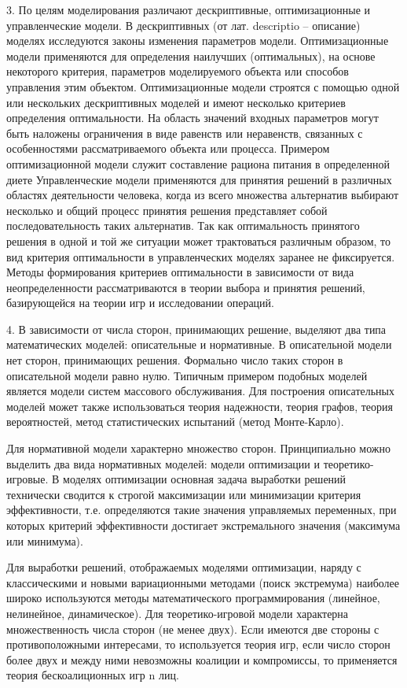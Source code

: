3. По целям моделирования различают дескриптивные, оптимизационные и управленческие модели. В дескриптивных (от лат. descriptio – описание) моделях исследуются законы изменения параметров модели. 
Оптимизационные модели применяются для определения наилучших (оптимальных), на основе некоторого критерия, параметров моделируемого объекта или способов управления этим объектом. Оптимизационные модели строятся с помощью одной или нескольких дескриптивных моделей и имеют несколько критериев определения оптимальности. На область значений входных параметров могут быть наложены ограничения в виде равенств или неравенств, связанных с особенностями рассматриваемого объекта или процесса. Примером оптимизационной модели служит составление рациона питания в определенной диете 
Управленческие модели применяются для принятия решений в различных областях деятельности человека, когда из всего множества альтернатив выбирают несколько и общий процесс принятия решения представляет собой последовательность таких альтернатив. Так как оптимальность принятого решения в одной и той же ситуации может трактоваться различным образом, то вид критерия оптимальности в управленческих моделях заранее не фиксируется. Методы формирования критериев оптимальности в зависимости от вида неопределенности рассматриваются в теории выбора и принятия решений, базирующейся на теории игр и исследовании операций.


4. В зависимости от числа сторон, принимающих решение, выделяют два типа математических моделей: описательные и нормативные. В описательной модели нет сторон, принимающих решения. Формально число таких сторон в описательной модели равно нулю. Типичным примером подобных моделей является модели систем массового обслуживания. Для построения описательных моделей может также использоваться теория надежности, теория графов, теория вероятностей, метод статистических испытаний (метод Монте-Карло).


Для нормативной модели характерно множество сторон. Принципиально можно выделить два вида нормативных моделей: модели оптимизации и теоретико-игровые. В моделях оптимизации основная задача выработки решений технически сводится к строгой максимизации или минимизации критерия эффективности, т.е. определяются такие значения управляемых переменных, при которых критерий эффективности достигает экстремального значения (максимума или минимума).


Для выработки решений, отображаемых моделями оптимизации, наряду с классическими и новыми вариационными методами (поиск экстремума) наиболее широко используются методы математического программирования (линейное, нелинейное, динамическое). Для теоретико-игровой модели характерна множественность числа сторон (не менее двух). Если имеются две стороны с противоположными интересами, то используется теория игр, если число сторон более двух и между ними невозможны коалиции и компромиссы, то применяется теория бескоалиционных игр n лиц.


